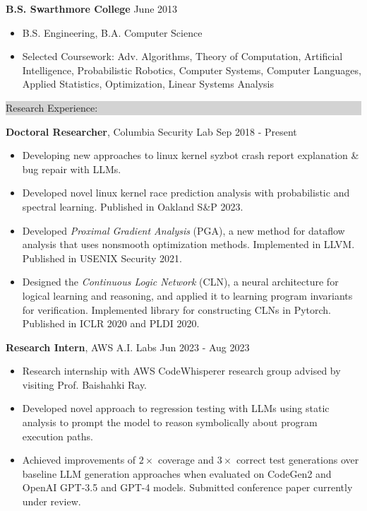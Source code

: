 \documentclass{article} %
\newcommand{\rsection}[1]{
  \hspace{-0.4cm}\vspace{0.1cm}
\colorbox{lightgrey}{
\begin{minipage}{1.07\linewidth}
\vspace{0.22cm}
\fontsize{14pt}{16pt}\selectfont #1
\vspace{0.12cm}
\end{minipage}
}
\vspace*{-0.1cm}
}
\newcommand{\rjob}[2]{
  \hspace*{-0.3cm}
{\fontsize{10pt}{12pt}\selectfont #1} \hfill #2
\vspace*{0.1cm}
\hspace*{-1.2cm}
}
\newenvironment{ritemize}{
\hspace*{-0.8cm}
\begin{minipage}{1.05\linewidth}
\begin{itemize}
}{
\end{itemize}
\end{minipage}
}
\newcommand{\ritem}{
\item[-]
}
\begin{document}
\rjob{\textbf{B.S. Swarthmore College}}{June 2013}\\
\begin{ritemize}
    \ritem B.S. Engineering, B.A. Computer Science %
\ritem Selected Coursework: Adv. Algorithms, Theory of Computation, Artificial Intelligence, Probabilistic Robotics, Computer Systems, Computer Languages, Applied Statistics, Optimization, Linear Systems Analysis
\end{ritemize}
\vspace{0.25cm}



\rsection{Research Experience:}


\rjob{\textbf{Doctoral Researcher}, Columbia Security Lab}{Sep 2018 - Present}\\
\begin{ritemize}
    \ritem Developing new approaches to linux kernel syzbot crash report explanation \& bug repair with LLMs.
    \ritem Developed novel linux kernel race prediction analysis with probabilistic and spectral learning. Published in Oakland S\&P 2023.
    \ritem Developed \textit{Proximal Gradient Analysis} (PGA), a new method for dataflow analysis that uses nonsmooth optimization methods. Implemented in LLVM. Published in USENIX Security 2021.
    \ritem Designed the \textit{Continuous Logic Network} (CLN), a neural architecture for logical learning and reasoning, and applied it to learning program invariants for verification. Implemented library for constructing CLNs in Pytorch. Published in ICLR 2020 and PLDI 2020.
\end{ritemize}


\rjob{\textbf{Research Intern}, AWS A.I. Labs}{Jun 2023 - Aug 2023}\\
\begin{ritemize}
  \ritem Research internship with AWS CodeWhisperer research group advised by visiting Prof. Baishahki Ray.
  \ritem Developed novel approach to regression testing with LLMs using static analysis to prompt the model to reason symbolically about program execution paths.
  \ritem Achieved improvements of $2\times$ coverage and $3\times$ correct test generations over baseline LLM generation approaches when evaluated on CodeGen2 and OpenAI GPT-3.5 and GPT-4 models. Submitted conference paper currently under review.
\end{ritemize}
\end{document}
